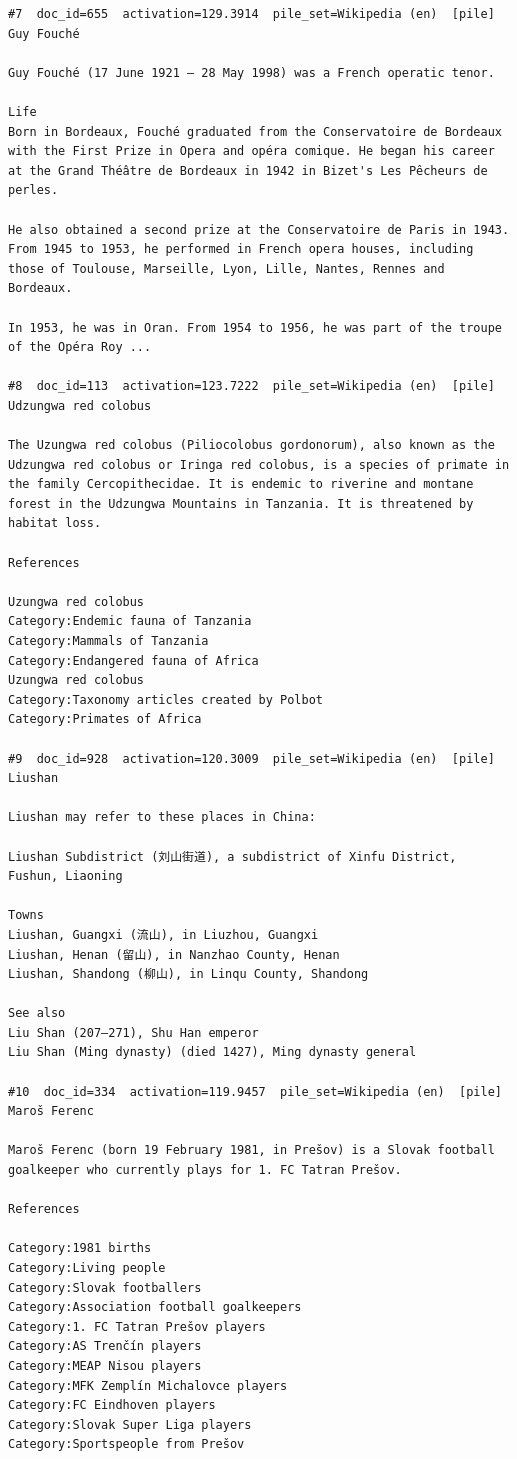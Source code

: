 \begin{verbatim}
#7  doc_id=655  activation=129.3914  pile_set=Wikipedia (en)  [pile]
Guy Fouché

Guy Fouché (17 June 1921 – 28 May 1998) was a French operatic tenor.

Life 
Born in Bordeaux, Fouché graduated from the Conservatoire de Bordeaux with the First Prize in Opera and opéra comique. He began his career at the Grand Théâtre de Bordeaux in 1942 in Bizet's Les Pêcheurs de perles.

He also obtained a second prize at the Conservatoire de Paris in 1943. From 1945 to 1953, he performed in French opera houses, including those of Toulouse, Marseille, Lyon, Lille, Nantes, Rennes and Bordeaux.

In 1953, he was in Oran. From 1954 to 1956, he was part of the troupe of the Opéra Roy ...

#8  doc_id=113  activation=123.7222  pile_set=Wikipedia (en)  [pile]
Udzungwa red colobus

The Uzungwa red colobus (Piliocolobus gordonorum), also known as the Udzungwa red colobus or Iringa red colobus, is a species of primate in the family Cercopithecidae. It is endemic to riverine and montane forest in the Udzungwa Mountains in Tanzania. It is threatened by habitat loss.

References

Uzungwa red colobus
Category:Endemic fauna of Tanzania
Category:Mammals of Tanzania
Category:Endangered fauna of Africa
Uzungwa red colobus
Category:Taxonomy articles created by Polbot
Category:Primates of Africa

#9  doc_id=928  activation=120.3009  pile_set=Wikipedia (en)  [pile]
Liushan

Liushan may refer to these places in China:

Liushan Subdistrict (刘山街道), a subdistrict of Xinfu District, Fushun, Liaoning

Towns
Liushan, Guangxi (流山), in Liuzhou, Guangxi
Liushan, Henan (留山), in Nanzhao County, Henan
Liushan, Shandong (柳山), in Linqu County, Shandong

See also
Liu Shan (207–271), Shu Han emperor
Liu Shan (Ming dynasty) (died 1427), Ming dynasty general

#10  doc_id=334  activation=119.9457  pile_set=Wikipedia (en)  [pile]
Maroš Ferenc

Maroš Ferenc (born 19 February 1981, in Prešov) is a Slovak football goalkeeper who currently plays for 1. FC Tatran Prešov.

References

Category:1981 births
Category:Living people
Category:Slovak footballers
Category:Association football goalkeepers
Category:1. FC Tatran Prešov players
Category:AS Trenčín players
Category:MEAP Nisou players
Category:MFK Zemplín Michalovce players
Category:FC Eindhoven players
Category:Slovak Super Liga players
Category:Sportspeople from Prešov

\end{verbatim}

